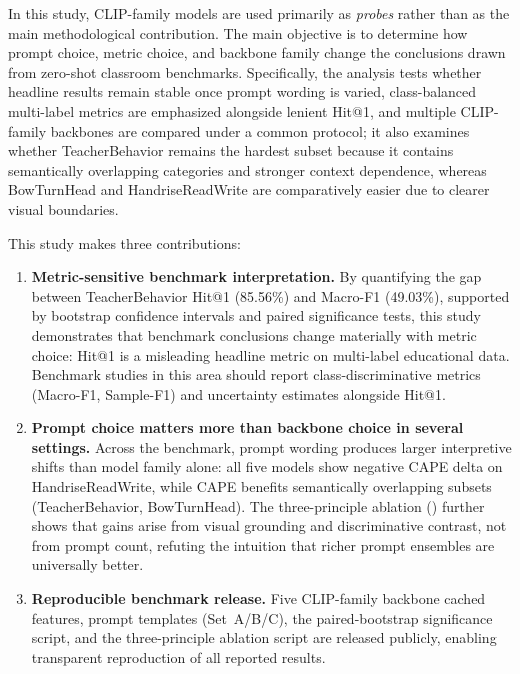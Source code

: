 \documentclass[electronics,article,submit,pdftex,moreauthors]{Definitions/mdpi}
\begin{document}
In this study, CLIP-family models are used primarily as \emph{probes} rather than as the main methodological contribution. The main objective is to determine how prompt choice, metric choice, and backbone family change the conclusions drawn from zero-shot classroom benchmarks. Specifically, the analysis tests whether headline results remain stable once prompt wording is varied, class-balanced multi-label metrics are emphasized alongside lenient Hit@1, and multiple CLIP-family backbones are compared under a common protocol; it also examines whether TeacherBehavior remains the hardest subset because it contains semantically overlapping categories and stronger context dependence, whereas BowTurnHead and HandriseReadWrite are comparatively easier due to clearer visual boundaries.

This study makes three contributions:

\begin{enumerate}
    \item \textbf{Metric-sensitive benchmark interpretation.} By quantifying the gap between TeacherBehavior Hit@1 (85.56\%) and Macro-F1 (49.03\%), supported by bootstrap confidence intervals and paired significance tests, this study demonstrates that benchmark conclusions change materially with metric choice: Hit@1 is a misleading headline metric on multi-label educational data. Benchmark studies in this area should report class-discriminative metrics (Macro-F1, Sample-F1) and uncertainty estimates alongside Hit@1.

    \item \textbf{Prompt choice matters more than backbone choice in several settings.} Across the benchmark, prompt wording produces larger interpretive shifts than model family alone: all five models show negative CAPE delta on HandriseReadWrite, while CAPE benefits semantically overlapping subsets (TeacherBehavior, BowTurnHead). The three-principle ablation () further shows that gains arise from visual grounding and discriminative contrast, not from prompt count, refuting the intuition that richer prompt ensembles are universally better.

    \item \textbf{Reproducible benchmark release.} Five CLIP-family backbone cached features, prompt templates (Set~A/B/C), the paired-bootstrap significance script, and the three-principle ablation script are released publicly, enabling transparent reproduction of all reported results.
\end{enumerate}
\end{document}
